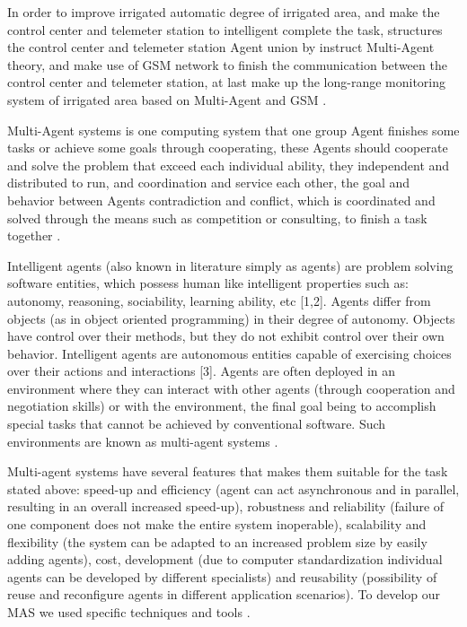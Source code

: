\documentclass[letterpaper, 10 pt, conference]{ieeeconf}  %
\begin{document}
In order to improve irrigated automatic degree of irrigated area, and make the control center and telemeter station to intelligent complete the task, structures the control center and telemeter station Agent union by instruct Multi-Agent theory, and make use of GSM network to finish the communication between the control center and telemeter station, at last make up the long-range monitoring system of irrigated area based on Multi-Agent and GSM \cite{Zhao2008}.

Multi-Agent systems is one computing system that one group Agent finishes some tasks or achieve some goals through cooperating, these Agents should cooperate and solve the problem that exceed each individual ability, they independent and distributed to run, and coordination and service each other, the goal and behavior between Agents contradiction and conflict, which is coordinated and solved through the means such as competition or consulting, to finish a task together \cite{Zhao2008}.

Intelligent agents (also known in literature simply as agents) are problem solving software entities, which possess human like intelligent properties such as: autonomy, reasoning, sociability, learning ability, etc [1,2]. Agents differ from objects (as in object oriented programming) in their degree of autonomy. Objects have control over their methods, but they do not exhibit control over their own behavior.  Intelligent agents are autonomous entities capable of exercising choices over their actions and interactions [3]. Agents are often deployed in an environment where they can interact with other agents (through cooperation and negotiation skills) or with the environment, the final goal being to accomplish special tasks that cannot be achieved by conventional software. Such environments are known as multi-agent systems \cite{Nichita2007}.

Multi-agent systems have several features that makes them suitable for the task stated above: speed-up and efficiency (agent can act asynchronous and in parallel, resulting in an overall increased speed-up), robustness and reliability (failure of one component does not make the entire system inoperable), scalability and flexibility (the system can be adapted to an increased problem size by easily adding agents), cost, development (due to computer standardization individual agents can be developed by different specialists) and reusability (possibility of reuse and reconfigure agents in different application scenarios).
To develop our MAS we used specific techniques and tools \cite{Nichita2007}.
\end{document}
